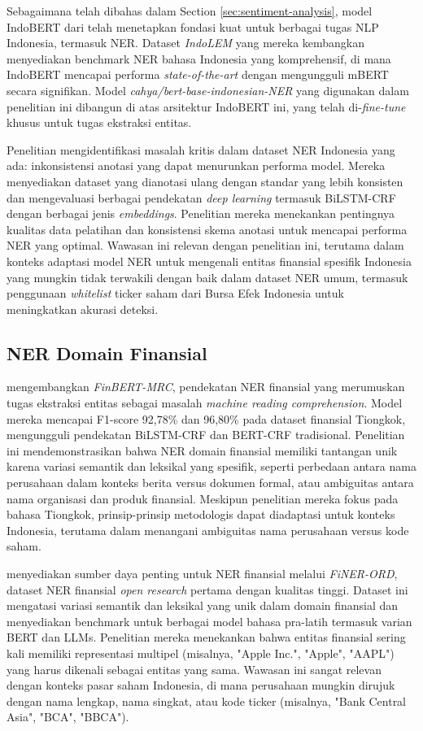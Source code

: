 Sebagaimana telah dibahas dalam Section \ref{sec:sentiment-analysis}, model IndoBERT dari \textcite{koto2020} telah menetapkan fondasi kuat untuk berbagai tugas NLP Indonesia, termasuk NER. Dataset \textit{IndoLEM} yang mereka kembangkan menyediakan benchmark NER bahasa Indonesia yang komprehensif, di mana IndoBERT mencapai performa \textit{state-of-the-art} dengan mengungguli mBERT secara signifikan. Model \textit{cahya/bert-base-indonesian-NER} yang digunakan dalam penelitian ini dibangun di atas arsitektur IndoBERT ini, yang telah di-\textit{fine-tune} khusus untuk tugas ekstraksi entitas.

Penelitian \textcite{khairunnisa2020} mengidentifikasi masalah kritis dalam dataset NER Indonesia yang ada: inkonsistensi anotasi yang dapat menurunkan performa model. Mereka menyediakan dataset yang dianotasi ulang dengan standar yang lebih konsisten dan mengevaluasi berbagai pendekatan \textit{deep learning} termasuk BiLSTM-CRF dengan berbagai jenis \textit{embeddings}. Penelitian mereka menekankan pentingnya kualitas data pelatihan dan konsistensi skema anotasi untuk mencapai performa NER yang optimal. Wawasan ini relevan dengan penelitian ini, terutama dalam konteks adaptasi model NER untuk mengenali entitas finansial spesifik Indonesia yang mungkin tidak terwakili dengan baik dalam dataset NER umum, termasuk penggunaan \textit{whitelist} ticker saham dari Bursa Efek Indonesia untuk meningkatkan akurasi deteksi.

\subsection{NER Domain Finansial}

\textcite{zhang2022finbert} mengembangkan \textit{FinBERT-MRC}, pendekatan NER finansial yang merumuskan tugas ekstraksi entitas sebagai masalah \textit{machine reading comprehension}. Model mereka mencapai F1-score 92,78\% dan 96,80\% pada dataset finansial Tiongkok, mengungguli pendekatan BiLSTM-CRF dan BERT-CRF tradisional. Penelitian ini mendemonstrasikan bahwa NER domain finansial memiliki tantangan unik karena variasi semantik dan leksikal yang spesifik, seperti perbedaan antara nama perusahaan dalam konteks berita versus dokumen formal, atau ambiguitas antara nama organisasi dan produk finansial. Meskipun penelitian mereka fokus pada bahasa Tiongkok, prinsip-prinsip metodologis dapat diadaptasi untuk konteks Indonesia, terutama dalam menangani ambiguitas nama perusahaan versus kode saham.

\textcite{shah2023} menyediakan sumber daya penting untuk NER finansial melalui \textit{FiNER-ORD}, dataset NER finansial \textit{open research} pertama dengan kualitas tinggi. Dataset ini mengatasi variasi semantik dan leksikal yang unik dalam domain finansial dan menyediakan benchmark untuk berbagai model bahasa pra-latih termasuk varian BERT dan LLMs. Penelitian mereka menekankan bahwa entitas finansial sering kali memiliki representasi multipel (misalnya, "Apple Inc.", "Apple", "AAPL") yang harus dikenali sebagai entitas yang sama. Wawasan ini sangat relevan dengan konteks pasar saham Indonesia, di mana perusahaan mungkin dirujuk dengan nama lengkap, nama singkat, atau kode ticker (misalnya, "Bank Central Asia", "BCA", "BBCA").

